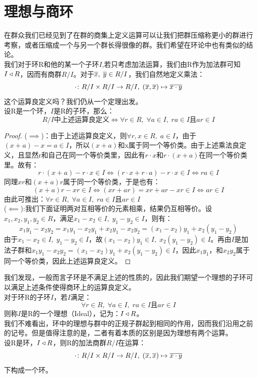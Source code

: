 \section{理想与商环}
\indent 在群众我们已经见到了在群的商集上定义运算可以让我们把群压缩称更小的群进行考察，或者压缩成一个与另一个群长得很像的群。我们希望在环论中也有类似的结论。\\
\indent 我们对于环R和他的某一个子环$I$,若只考虑加法运算，我们由R作为加法群可知$I\triangleleft R$，因而有商群$R/I$。对于$\overline{x},\; \overline{y}\in R/I$，我们自然地定义乘法：
\[
\cdot \colon R/I\times R/I\to R/I ,\; (\overline{x},\overline{x})\mapsto \overline{x\cdot y}
\]
这个运算良定义吗？我们仍从一个定理出发。\\
设R是一个环，$I$是R的子环，那么：
\[
R/I\text{中上述运算良定义}\iff \forall r\in R,\; \forall a\in I,\; ra\in I\text{且}ar\in I
\]
\begin{proof}
($\implies$)：由于上述运算良定义，则$\forall r,x\in R,\; a\in I$，由于$(x+a)-x=a\in I$，所以$(x+a)$和x属于同一个等价类。由于上述乘法良定义，且显然r和自己在同一个等价类里，因此有$r\cdot x$和$r\cdot (x+a)$在同一个等价类里。故有：
\[
r\cdot (x+a)-r\cdot x\in I\iff (r\cdot x+r\cdot a)-r\cdot x\in I\iff ra\in I
\]
同理$xr$和$(x+a)r$属于同一个等价类，于是也有：
\[
(x+a)r-xr\in I\iff (xr+ar)=xr+ar-xr\in I\iff ar\in I
\]
由此可推出：$\forall r\in R,\; \forall a\in I,\; ra\in I\text{且}ar\in I$\\
($\impliedby$):我们下面证明两对互相等价的元素相乘，结果仍互相等价。设$x_1,x_2,y_1,y_2\in R$，满足$x_1-x_2\in I,\; y_1-y_2\in I$，则有：
\[
x_1y_1-x_2y_2=x_1y_1-x_2y_1+x_2y_1-x_2y_2=(x_1-x_2)y_1+x_2(y_1-y_2)
\]
由于$x_1-x_2\in I,\; y_1-y_2\in I$，故$(x_1-x_2)y_1\in I,\; x_2(y_1-y_2)\in I$。再由$I$是加法子群和$x_1y_1-x_2y_2=(x_1-x_2)y_1+x_2(y_1-y_2)\in I$，因此$x_1y_1$，和$x_2y_2$属于同一个等价类，因此上述运算良定义。
\end{proof}
我们发现，一般而言子环是不满足上述的性质的，因此我们期望一个理想的子环可以满足上述条件使得商环上的运算良定义。\\
对于环R的子环$I$，若$I$满足：
\[
\forall r\in R,\; \forall a\in I,\; ra\in I\text{且}ar\in I
\]
则称$I$是R的一个理想（Ideal），记为：$I\triangleleft R$。\\
\indent 我们不难看出，环中的理想与群中的正规子群起到相同的作用，因而我们沿用之前的记号。但是值得注意的是，二者有着本质的区别是因为理想有两个运算。\\
设R是环，$I\triangleleft R$，则R的加法商群$R/I$在运算：
\[
\cdot \colon R/I\times R/I\to R/I ,\; (\overline{x},\overline{x})\mapsto \overline{x\cdot y}
\]
下构成一个环。\\
